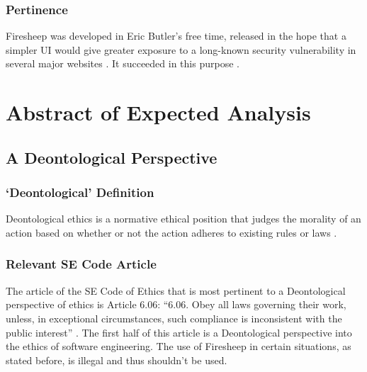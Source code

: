 \documentclass[12pt,twocolumn]{article}
\begin{document}
\subsubsection{Pertinence}
Firesheep was developed in Eric Butler's free time, released in the hope that a simpler UI would give greater exposure to a long-known security vulnerability in several major websites \cite{firesheep-huge-hit}. It succeeded in this purpose \cite{firesheep-day-later}.



\section{Abstract of Expected Analysis}

\subsection{A Deontological Perspective}
\subsubsection{`Deontological' Definition}
Deontological ethics is a normative ethical position that judges the morality of an action based on whether or not the action adheres to existing rules or laws \cite{virtue-ethics}.

\subsubsection{Relevant SE Code Article}
The article of the SE Code of Ethics that is most pertinent to a Deontological perspective of ethics is Article 6.06: ``6.06. Obey all laws governing their work, unless, in exceptional circumstances, such compliance is inconsistent with the public interest'' \cite{se-code}. The first half of this article is a Deontological perspective into the ethics of software engineering. The use of Firesheep in certain situations, as stated before, is illegal and thus shouldn't be used. 
\end{document}
